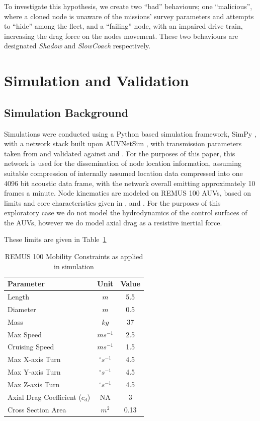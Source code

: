 \documentclass[conference,compsoc,letterpaper]{IEEEtran}
\begin{document}
To investigate this hypothesis, we create two ``bad'' behaviours; one ``malicious'', where a cloned node is unaware of the missions' survey parameters and attempts to ``hide'' among the fleet, and a ``failing'' node, with an impaired drive train, increasing the drag force on the nodes movement.
These two behaviours are designated \emph{Shadow} and \emph{SlowCoach} respectively.

\section{Simulation and Validation}\label{sec:sim_and_valid}

\subsection{Simulation Background}

Simulations were conducted using a Python based simulation framework, SimPy \cite{Mueller2003SimPy}, with a network stack built upon AUVNetSim \cite{Miquel2008}, with transmission parameters taken from and validated against \cite{Stojanovic2007} and \cite{Stefanov2011}.
For the purposes of this paper, this network is used for the dissemination of node location information, assuming suitable compression of internally assumed location data compressed into one 4096 bit acoustic data frame, with the network overall emitting approximately 10 frames a minute.
Node kinematics are modeled on REMUS 100 AUVs, based on limits and core characteristics given in \cite{Mcewen2001}, \cite{Milgram2001} and \cite{Samad2011}.
For the purposes of this exploratory case we do not model the hydrodynamics of the control surfaces of the AUVs, however we do model axial drag as a resistive inertial force.

These limits are given in Table~\ref{tab:mobility_sysconstraints}
\begin{table}[h]
  \caption{REMUS 100 Mobility Constraints as applied in simulation} \label{tab:mobility_sysconstraints}
  \begin{center}
    \setlength{\tabcolsep}{8pt}
    \begin{tabular}{lcc}
      \toprule
      Parameter & Unit & Value \\
      \midrule
      Length & $m$ & 5.5\\
      Diameter & $m$ & 0.5\\
      Mass & $kg$ & 37 \\ 
      Max Speed & $ms^{-1}$ & 2.5\\
      Cruising Speed & $ms^{-1}$ & 1.5\\
      Max X-axis Turn & $^{\circ} s^{-1}$ & 4.5\\
      Max Y-axis Turn & $^{\circ} s^{-1}$ & 4.5\\
      Max Z-axis Turn & $^{\circ} s^{-1}$ & 4.5\\
      Axial Drag Coefficient ($c_d$) & NA & 3\\
      Cross Section Area & $m^2$ & 0.13\\
      \bottomrule
    \end{tabular}
    \setlength{\tabcolsep}{6pt}
  \end{center}
\end{table}
\end{document}
